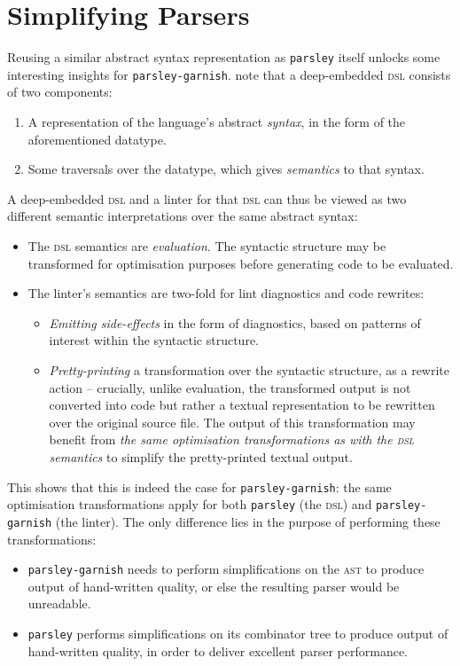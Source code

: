 \documentclass[../../../main.tex]{subfiles}
\begin{document}
\section{Simplifying Parsers}\label{sec:simplify-parsers}

Reusing a similar abstract syntax representation as \texttt{parsley} itself unlocks some interesting insights for \texttt{parsley-garnish}.
\textcite{gibbons_dsls_2014} note that a deep-embedded \textsc{dsl} consists of two components:
\begin{enumerate}
  \item A representation of the language's abstract \emph{syntax}, in the form of the aforementioned datatype.
  \item Some traversals over the datatype, which gives \emph{semantics} to that syntax.
\end{enumerate}
%
A deep-embedded \textsc{dsl} and a linter for that \textsc{dsl} can thus be viewed as two different semantic interpretations over the same abstract syntax:
\begin{itemize}
  \item The \textsc{dsl} semantics are \emph{evaluation}. The syntactic structure may be transformed for optimisation purposes before generating code to be evaluated. %
  \item The linter's semantics are two-fold for lint diagnostics and code rewrites:
  \begin{itemize}
    \item \emph{Emitting side-effects} in the form of diagnostics, based on patterns of interest within the syntactic structure.
    \item \emph{Pretty-printing} a transformation over the syntactic structure, as a rewrite action -- crucially, unlike evaluation, the transformed output is not converted into code but rather a textual representation to be rewritten over the original source file. The output of this transformation may benefit from \emph{the same optimisation transformations as with the \textsc{dsl} semantics} to simplify the pretty-printed textual output.
  \end{itemize}
\end{itemize}
%
This  shows that this is indeed the case for \texttt{parsley-garnish}:
the same optimisation transformations apply for both \texttt{parsley} (the \textsc{dsl}) and \texttt{parsley-garnish} (the linter).
The only difference lies in the purpose of performing these transformations:
\begin{itemize}
  \item \texttt{parsley-garnish} needs to perform simplifications on the  \textsc{ast} to produce output of hand-written quality, or else the resulting parser would be unreadable.
  \item \texttt{parsley} performs simplifications on its combinator tree to produce output of hand-written quality, in order to deliver excellent parser performance.
\end{itemize}
\end{document}
